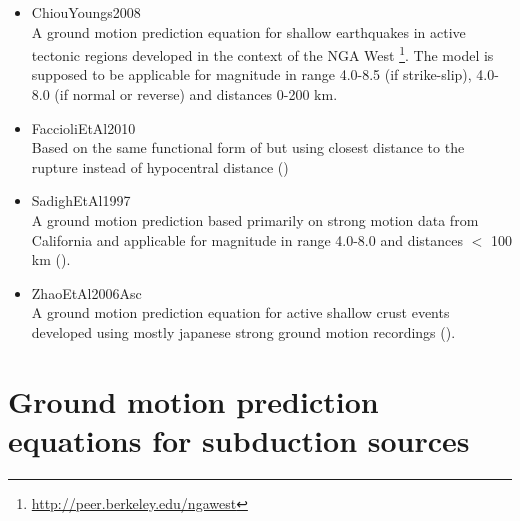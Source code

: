 \begin{itemize}
\item ChiouYoungs2008 \hfill \\ A ground motion prediction equation for
shallow earthquakes in active tectonic regions developed in the context of the
NGA West \footnote{
\href{http://peer.berkeley.edu/ngawest/}{http://peer.berkeley.edu/ngawest}}.
The model is supposed to be applicable for magnitude in range 4.0-8.5 (if
strike-slip), 4.0-8.0 (if normal or reverse) and distances 0-200 km.

\item FaccioliEtAl2010 \hfill \\ Based on the same functional form of
\cite{cauzzi2008} but using closest distance to the rupture instead of
hypocentral distance (\cite{faccioli2010})

\item SadighEtAl1997 \hfill \\ A ground motion prediction based primarily on
strong motion data from California and applicable for magnitude in range 4.0-8.0
and distances $<$ 100 km (\cite{sadigh1997}).

\item ZhaoEtAl2006Asc \hfill \\ A ground motion prediction equation for active
shallow crust events developed using mostly japanese strong ground motion
recordings (\cite{zhao2006}).

\end{itemize}



\section[GMPEs for subduction sources]{Ground motion prediction equations for subduction sources}

